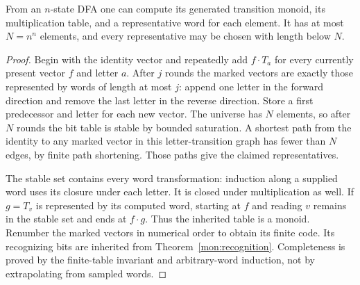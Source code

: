 \begin{theorem}\label{mon:generated}
From an $n$-state DFA one can compute its generated transition monoid,
its multiplication table, and a representative word for each element.
It has at most $N=n^n$ elements, and every representative may be chosen
with length below $N$.
\end{theorem}
\begin{proof}
Begin with the identity vector and repeatedly add $f\cdot T_a$ for every
currently present vector $f$ and letter $a$. After $j$ rounds the marked
vectors are exactly those represented by words of length at most $j$:
append one letter in the forward direction and remove the last letter in
the reverse direction. Store a first predecessor and letter for each new
vector. The universe has $N$ elements, so after $N$ rounds the bit table
is stable by bounded saturation. A shortest path from the identity to any
marked vector in this letter-transition graph has fewer than $N$ edges,
by finite path shortening. Those paths give the claimed representatives.

The stable set contains every word transformation: induction along a
supplied word uses its closure under each letter. It is closed under
multiplication as well. If $g=T_v$ is represented by its computed word,
starting at $f$ and reading $v$ remains in the stable set and ends at
$f\cdot g$. Thus the inherited table is a monoid. Renumber the marked
vectors in numerical order to obtain its finite code. Its recognizing
bits are inherited from Theorem~\ref{mon:recognition}. Completeness is
proved by the finite-table invariant and arbitrary-word induction, not
by extrapolating from sampled words.
\end{proof}

